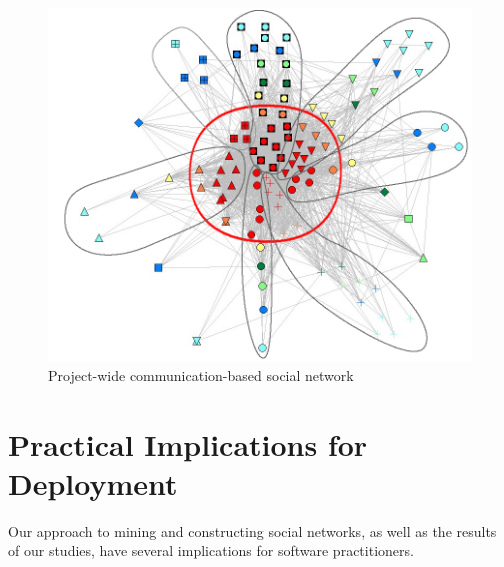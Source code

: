 \begin{figure}[t]
\begin{center}
\includegraphics[width=0.99\columnwidth]{./figures/JazzProjectSN}
\caption{Project-wide communication-based social network}
\label{fig:JazzProjectSN}
\end{center}
\end{figure}







\section{Practical Implications for Deployment} 

Our approach to mining and constructing social networks, as well as the results
of our studies, have several implications for software practitioners.


